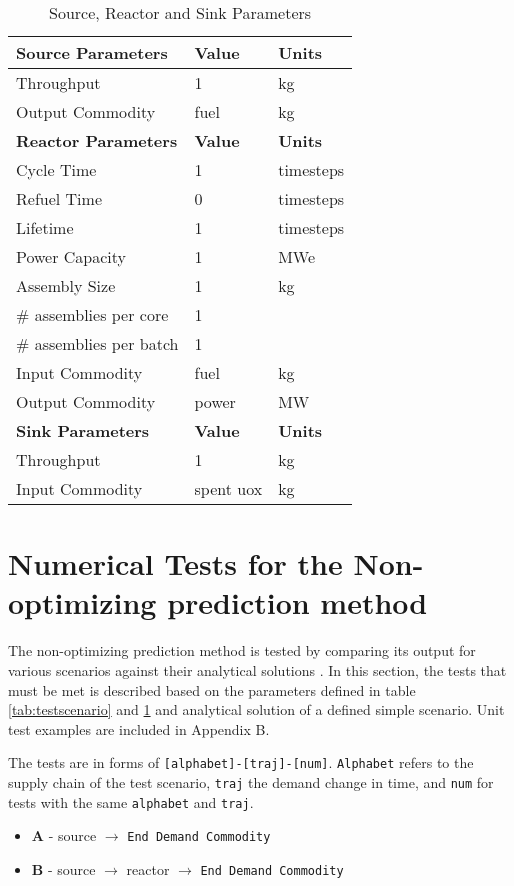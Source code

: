 \documentclass[11pt,letterpaper]{article}
\begin{document}
\begin{table}[H]
	\centering
    \caption {Source, Reactor and Sink Parameters}
	\label{tab:reactor}
	\begin{tabular}{|l|l|l|}
\hline
\textbf{Source Parameters} & \textbf{Value} & \textbf{Units} \\
\hline
Throughput & 1 & kg \\
Output Commodity & fuel & kg\\
\hline
\textbf{Reactor Parameters} & \textbf{Value} & \textbf{Units} \\
\hline
Cycle Time & 1 & timesteps \\
Refuel Time & 0 & timesteps \\
Lifetime & 1 & timesteps \\
Power Capacity & 1& MWe \\
Assembly Size & 1 & kg \\
\# assemblies per core & 1 & \\
\# assemblies per batch & 1 & \\
Input Commodity & fuel & kg\\
Output Commodity & power & MW\\
\hline
\textbf{Sink Parameters} & \textbf{Value} & \textbf{Units} \\
Throughput & 1 & kg \\
Input Commodity & spent uox & kg\\
\hline
	\end{tabular}
\end{table}

\pagebreak

\section{Numerical Tests for the Non-optimizing prediction method}
The non-optimizing prediction method is tested by comparing its output for various scenarios against their analytical solutions . In this section, the tests that must be met is described based on the parameters defined in table \ref{tab:testscenario} and \ref{tab:reactor} and analytical solution of a defined simple scenario. Unit test examples are included in Appendix B.

The tests are in forms of \texttt{[alphabet]-[traj]-[num]}. \texttt{Alphabet} refers to the supply chain of the test scenario,
\texttt{traj} the demand change in time, and \texttt{num} for tests with the same \texttt{alphabet} and \texttt{traj}.
\begin{itemize}
	\item \textbf{A} - source $\rightarrow$ \texttt{End Demand Commodity}
	\item \textbf{B} - source $\rightarrow$ reactor $\rightarrow$ \texttt{End Demand Commodity}
\end{itemize}
\end{document}
